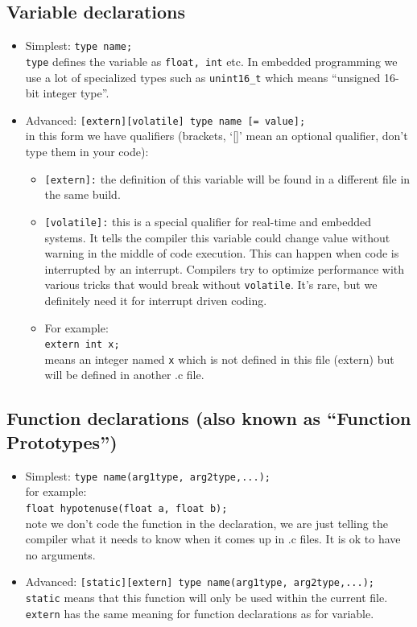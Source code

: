 \subsection{Variable declarations}

\begin{itemize}
  \item Simplest:   {\tt type name;}  \\
  {\tt type} defines the variable as {\tt float, int} etc.  In
  embedded programming we use a lot of specialized types such as
  {\tt unint16\_t}  which means ``unsigned 16-bit integer type''.
  \item Advanced:  {\tt [extern][volatile] type name [= value];}\\
  in this form we have qualifiers (brackets, `[]' mean an optional
  qualifier, don't type them in your code):
  \begin{itemize}
    \item {\tt[extern]:} the definition of this variable will be
    found in a different file in the same build.
    \item {\tt [volatile]:} this is a special qualifier for real-time
    and embedded systems.   It tells the compiler this variable could
    change value without warning in the middle of code execution.  This
    can happen when code is interrupted by an interrupt.   Compilers try
    to optimize performance with various tricks that would break without
    {\tt volatile}.  It's rare, but we definitely need it for interrupt
    driven coding.
    \item For example:\\
    {\tt extern int x;}\\
    means an integer named {\tt x}
    which is not defined in this file (extern) but will be defined
    in another .c file.
  \end{itemize}
\end{itemize}

\subsection{Function declarations (also known as ``Function Prototypes'')}
\begin{itemize}
  \item Simplest:   {\tt type name(arg1type, arg2type,...);}  \\
  for example:\\
  {\tt float hypotenuse(float a, float b);}\\
  note we don't code the function in the declaration, we are just
  telling the compiler what it needs to know when it comes up in
  .c files.  It is ok to have no arguments.
  \item Advanced: {\tt [static][extern] type name(arg1type, arg2type,...);}  \\
  {\tt static} means that this function will only be used within
  the current file. {\tt extern} has the same meaning for function
  declarations as for variable.
\end{itemize}



